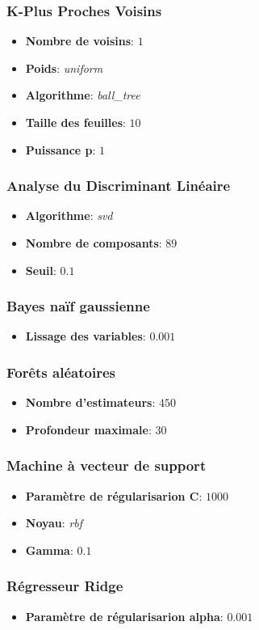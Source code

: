 \subsubsection*{K-Plus Proches Voisins}
\begin{itemize}
	\item \textbf{Nombre de voisins}: $1$
	\item \textbf{Poids}: \emph{uniform}
	\item \textbf{Algorithme}: \emph{ball\_tree}
	\item \textbf{Taille des feuilles}: $10$
	\item \textbf{Puissance p}: $1$
\end{itemize}

\subsubsection*{Analyse du Discriminant Linéaire}
\begin{itemize}
	\item \textbf{Algorithme}: \emph{svd}
	\item \textbf{Nombre de composants}: $89$
	\item \textbf{Seuil}: $0.1$
\end{itemize}

\subsubsection*{Bayes naïf gaussienne}
\begin{itemize}
	\item \textbf{Lissage des variables}: $0.001$
\end{itemize}

\subsubsection*{Forêts aléatoires}
\begin{itemize}
	\item \textbf{Nombre d'estimateurs}: $450$
	\item \textbf{Profondeur maximale}: $30$
\end{itemize}

\subsubsection*{Machine à vecteur de support}
\begin{itemize}
	\item \textbf{Paramètre de régularisarion C}: $1000$
	\item \textbf{Noyau}: \emph{rbf}
	\item \textbf{Gamma}: $0.1$
\end{itemize}

\subsubsection*{Régresseur Ridge}
\begin{itemize}
	\item \textbf{Paramètre de régularisarion alpha}: $0.001$
\end{itemize}


